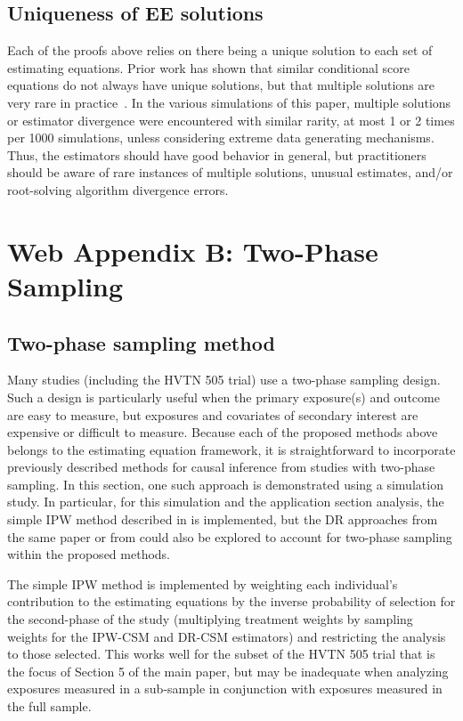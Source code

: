 \documentclass[12pt]{article}
\begin{document}
\subsection{Uniqueness of EE solutions}

Each of the proofs above relies on there being a unique solution to each set of estimating equations. Prior work has shown that similar conditional score equations do not always have unique solutions, but that multiple solutions are very rare in practice~\citep{stefanski1987}. In the various simulations of this paper, multiple solutions or estimator divergence were encountered with similar rarity, at most 1 or 2 times per 1000 simulations, unless considering extreme data generating mechanisms. Thus, the estimators should have good behavior in general, but practitioners should be aware of rare instances of multiple solutions, unusual estimates, and/or root-solving algorithm divergence errors.

\section{Web Appendix B: Two-Phase Sampling}

\subsection{Two-phase sampling method}

Many studies (including the HVTN 505 trial) use a two-phase sampling design. Such a design is particularly useful when the primary exposure(s) and outcome are easy to measure, but exposures and covariates of secondary interest are expensive or difficult to measure. Because each of the proposed methods above belongs to the estimating equation framework, it is straightforward to incorporate previously described methods for causal inference from studies with two-phase sampling. In this section, one such approach is demonstrated using a simulation study. In particular, for this simulation and the application section analysis, the simple IPW method described in \citet{wang2009} is implemented, but the DR approaches from the same paper or from \citet{rose2011} could also be explored to account for two-phase sampling within the proposed methods.

The simple IPW method is implemented by weighting each individual's contribution to the estimating equations by the inverse probability of selection for the second-phase of the study (multiplying treatment weights by sampling weights for the IPW-CSM and DR-CSM estimators) and restricting the analysis to those selected. This works well for the subset of the HVTN 505 trial that is the focus of Section 5 of the main paper, but may be inadequate when analyzing exposures measured in a sub-sample in conjunction with exposures measured in the full sample.
\end{document}
